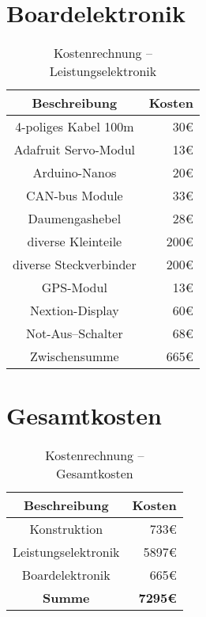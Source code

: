 \section{Boardelektronik}
\begin{table}[H]
    \centering
    \begin{tabular}{|c|r|}
        \hline
        \textbf{Beschreibung} & \textbf{Kosten}\\\hline
        4-poliges Kabel 100m & 30\euro\\
        Adafruit Servo-Modul & 13\euro\\
        Arduino-Nanos & 20\euro\\
        CAN-bus Module & 33\euro\\
        Daumengashebel & 28\euro\\
        diverse Kleinteile & 200\euro\\
        diverse Steckverbinder & 200\euro\\
        GPS-Modul & 13\euro\\
        Nextion-Display & 60\euro\\
        Not-Aus--Schalter & 68\euro\\        
        \hline
        Zwischensumme & 665\euro\\\hline
    \end{tabular}
    \caption{Kostenrechnung -- Leistungselektronik}
\end{table}

\section{Gesamtkosten}
\begin{table}[H]
    \centering
    \begin{tabular}{|c|r|}
        \hline
        \textbf{Beschreibung} & \textbf{Kosten}\\\hline
        Konstruktion & 733\euro\\
        Leistungselektronik & 5897\euro\\
        Boardelektronik & 665\euro\\
        \hline
        \textbf{Summe} & \textbf{7295\euro}\\\hline
    \end{tabular}
    \caption{Kostenrechnung -- Gesamtkosten}
\end{table}
